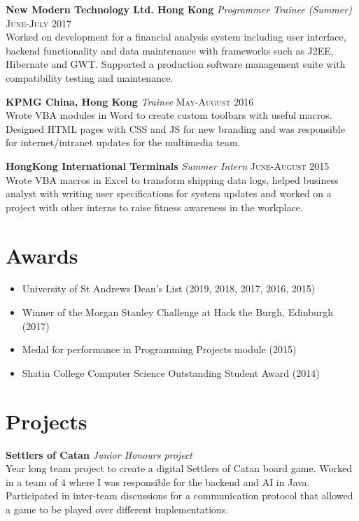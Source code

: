 \documentclass{article}
\begin{document}
\textbf{New Modern Technology Ltd. Hong Kong} \textit{Programmer Trainee (Summer)}
\hfill
\textsc{June-July 2017} \\
Worked on development for a financial analysis system including user interface, backend functionality and data maintenance with frameworks such as J2EE, Hibernate and GWT. Supported a production software management suite with compatibility testing and maintenance.

\textbf{KPMG China, Hong Kong} \textit{Trainee}
\hfill
\textsc{May-August 2016} \\
Wrote VBA modules in Word to create custom toolbars with useful macros. Designed HTML pages with CSS and JS for new branding and was responsible for internet/intranet updates for the multimedia team.

\textbf{HongKong International Terminals} \textit{Summer Intern}
\hfill
\textsc{June-August 2015} \\
Wrote VBA macros in Excel to transform shipping data logs, helped business analyst with writing user specifications for system updates and worked on a project with other interns to raise fitness awareness in the workplace.

\section*{Awards}
\setlength\multicolsep{0pt}
\begin{multicols}{2}
\begin{itemize}
\item University of St Andrews Dean's List (2019, 2018, 2017, 2016, 2015)
\item Winner of the Morgan Stanley Challenge at Hack the Burgh, Edinburgh (2017)
\end{itemize}
\columnbreak
\begin{itemize}
\item Medal for performance in Programming Projects module (2015)
\item Shatin College Computer Science Outstanding Student Award (2014)
\end{itemize}
\end{multicols}


\section*{Projects}
\textbf{Settlers of Catan} \textit{Junior Honours project} \\
Year long team project to create a digital Settlers of Catan board game. Worked in a team of 4 where I was responsible for the backend and AI in Java. Participated in inter-team discussions for a communication protocol that allowed a game to be played over different implementations.
\end{document}
